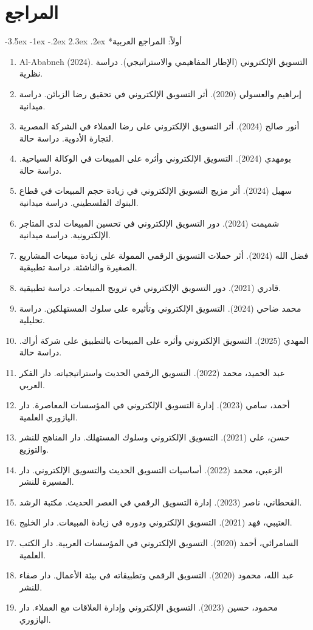 \documentclass[12pt, a4paper]{report}
\makeatletter
\newcommand{\lr}[1]{\textenglish{#1}}
\renewcommand\section{\@startsection{section}{1}{\z@}%
  {-3.5ex \@plus -1ex \@minus -.2ex}%
  {2.3ex \@plus .2ex}%
  {\normalfont\Large\bfseries\color{primaryblue}}}
\makeatother
\begin{document}
\chapter*{المراجع}

\section*{أولاً: المراجع العربية}

\begin{enumerate}[label=\arabic*.]
  \item \lr{Al-Ababneh} (2024). التسويق الإلكتروني (الإطار المفاهيمي والاستراتيجي). دراسة نظرية.
  \item إبراهيم والعسولي (2020). أثر التسويق الإلكتروني في تحقيق رضا الزبائن. دراسة ميدانية.
  \item أنور صالح (2024). أثر التسويق الإلكتروني على رضا العملاء في الشركة المصرية لتجارة الأدوية. دراسة حالة.
  \item بومهدي (2024). التسويق الإلكتروني وأثره على المبيعات في الوكالة السياحية. دراسة حالة.
  \item سهيل (2024). أثر مزيج التسويق الإلكتروني في زيادة حجم المبيعات في قطاع البنوك الفلسطيني. دراسة ميدانية.
  \item شميمت (2024). دور التسويق الإلكتروني في تحسين المبيعات لدى المتاجر الإلكترونية. دراسة ميدانية.
  \item فضل الله (2024). أثر حملات التسويق الرقمي الممولة على زيادة مبيعات المشاريع الصغيرة والناشئة. دراسة تطبيقية.
  \item قادري (2021). دور التسويق الإلكتروني في ترويج المبيعات. دراسة تطبيقية.
  \item محمد ضاحي (2024). التسويق الإلكتروني وتأثيره على سلوك المستهلكين. دراسة تحليلية.
  \item المهدي (2025). التسويق الإلكتروني وأثره على المبيعات بالتطبيق على شركة أراك. دراسة حالة.
  \item عبد الحميد، محمد (2022). التسويق الرقمي الحديث واستراتيجياته. دار الفكر العربي.
  \item أحمد، سامي (2023). إدارة التسويق الإلكتروني في المؤسسات المعاصرة. دار اليازوري العلمية.
  \item حسن، علي (2021). التسويق الإلكتروني وسلوك المستهلك. دار المناهج للنشر والتوزيع.
  \item الزعبي، محمد (2022). أساسيات التسويق الحديث والتسويق الإلكتروني. دار المسيرة للنشر.
  \item القحطاني، ناصر (2023). إدارة التسويق الرقمي في العصر الحديث. مكتبة الرشد.
  \item العتيبي، فهد (2021). التسويق الإلكتروني ودوره في زيادة المبيعات. دار الخليج.
  \item السامرائي، أحمد (2020). التسويق الإلكتروني في المؤسسات العربية. دار الكتب العلمية.
  \item عبد الله، محمود (2020). التسويق الرقمي وتطبيقاته في بيئة الأعمال. دار صفاء للنشر.
  \item محمود، حسين (2023). التسويق الإلكتروني وإدارة العلاقات مع العملاء. دار اليازوري.
\end{enumerate}
\end{document}
